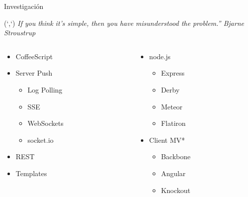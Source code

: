 \documentclass[xcolor=dvipsnames, 14pt]{beamer}
\newenvironment{reference}[2]{%
  \begin{textblock*}{\textwidth}(#1,#2)
      \footnotesize\it\bgroup\color{gray!50!black}}{\egroup\end{textblock*}}
\begin{document}
\begin{frame}{Investigación}
\begin{reference}{4mm}{13mm}
``If you think it's simple, then you have misunderstood the problem.'' Bjarne Stroustrup
\end{reference}

\begin{columns}

\begin{column}{0.5\textwidth}
    \begin{itemize}
    \item CoffeeScript
    \item Server Push
        \begin{itemize}
        \item Log Polling
        \item SSE
        \item WebSockets
        \item socket.io
        \end{itemize}
    \item REST
    \item Templates
    \end{itemize}
\end{column}

\begin{column}{0.5\textwidth}
    \begin{itemize}
    \item node.js
        \begin{itemize}
        \item Express
        \item Derby
        \item Meteor
        \item Flatiron
        \end{itemize}
    \item Client MV*
        \begin{itemize}
        \item Backbone
        \item Angular
        \item Knockout
        \end{itemize}
    \end{itemize}
\end{column}

\end{columns}

\end{frame}
\end{document}
